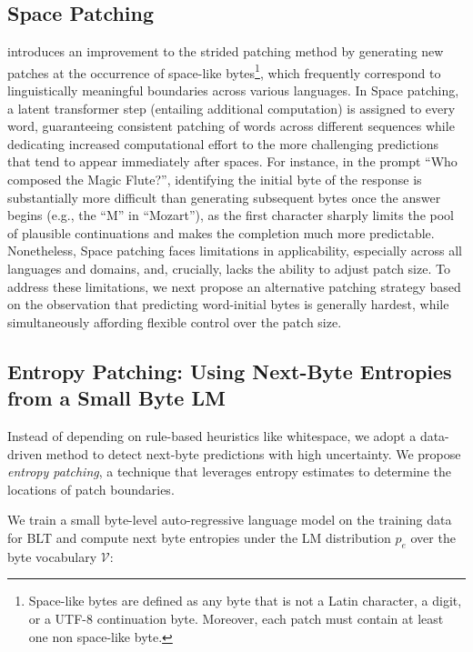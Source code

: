 \subsection{Space Patching}
\label{section:white-patch}

\citet{slagle2024spacebyte} introduces an improvement to the strided patching method by generating new patches at the occurrence of space-like bytes\footnote{
    Space-like bytes are defined as any byte that is not a Latin character, a digit, or a UTF-8 continuation byte. Moreover, each patch must contain at least one non space-like byte. }, which frequently correspond to linguistically meaningful boundaries across various languages. In Space patching, a latent transformer step (entailing additional computation) is assigned to every word, guaranteeing consistent patching of words across different sequences while dedicating increased computational effort to the more challenging predictions that tend to appear immediately after spaces. For instance, in the prompt ``Who composed the Magic Flute?\uline{\hspace{.6em}}'', identifying the initial byte of the response is substantially more difficult than generating subsequent bytes once the answer begins (e.g., the ``M'' in ``Mozart''), as the first character sharply limits the pool of plausible continuations and makes the completion much more predictable. Nonetheless, Space patching faces limitations in applicability, especially across all languages and domains, and, crucially, lacks the ability to adjust patch size. To address these limitations, we next propose an alternative patching strategy based on the observation that predicting word-initial bytes is generally hardest, while simultaneously affording flexible control over the patch size.

\subsection{Entropy Patching: Using Next-Byte Entropies from a Small Byte LM}
\label{section:dyn-patch}

Instead of depending on rule-based heuristics like whitespace, we adopt a data-driven method to detect next-byte predictions with high uncertainty. We propose \textit{entropy patching}, a technique that leverages entropy estimates to determine the locations of patch boundaries.

We train a small byte-level auto-regressive language model on the training data for {\textsc BLT} and compute next byte entropies under the LM distribution $p_{e}$ over the byte vocabulary $\mathcal{V}$:

